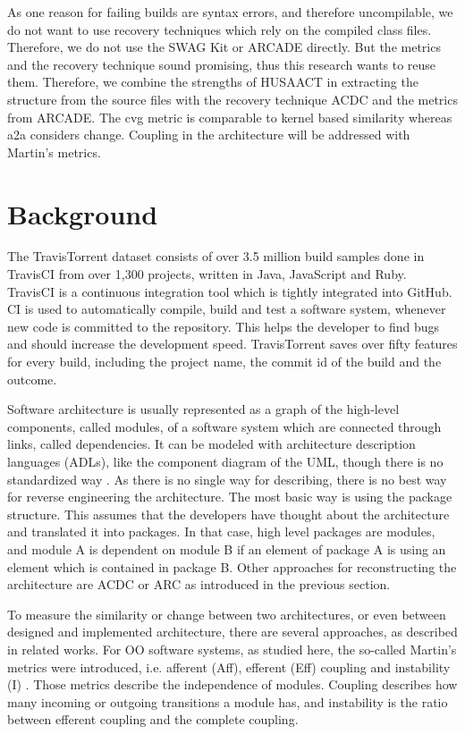 \documentclass[conference]{IEEEtran}
\begin{document}
As one reason for failing builds are syntax errors, and therefore uncompilable, we do not want to use recovery techniques which rely on the compiled class files. Therefore, we do not use the SWAG Kit or ARCADE directly.
But the metrics and the recovery technique sound promising, thus this research wants to reuse them. Therefore, we combine the strengths of HUSAACT in extracting the structure from the source files with the recovery technique ACDC and the metrics from ARCADE. The cvg metric is comparable to kernel based similarity whereas a2a considers change. Coupling in the architecture will be addressed with Martin's metrics.

\section{Background}

The TravisTorrent dataset \cite{TravisTorrent} consists of over 3.5 million build samples done in TravisCI from over 1,300 projects, written in Java, JavaScript and Ruby. TravisCI is a continuous integration tool which is tightly integrated into GitHub. CI is used to automatically compile, build and test a software system, whenever new code is committed to the repository. This helps the developer to find bugs and should increase the development speed. 
TravisTorrent saves over fifty features for every build, including the project name, the commit id of the build and the outcome.

Software architecture is usually represented as a graph of the high-level components, called modules, of a software system which are connected through links, called dependencies. It can be modeled with architecture description languages (ADLs), like the component diagram of the UML, though there is no standardized way \cite{UML-Arch}. 
As there is no single way for describing, there is no best way for reverse engineering the architecture. The most basic way is using the package structure. This assumes that the developers have thought about the architecture and translated it into packages. In that case, high level packages are modules, and module A is dependent on module B if an element of package A is using an element which is contained in package B.
Other approaches for reconstructing the architecture are ACDC or ARC as introduced in the previous section.

To measure the similarity or change between two architectures, or even between designed and implemented architecture, there are several approaches, as described in related works. For OO software systems, as studied here, the so-called Martin's metrics \cite{martinsMetrics} were introduced, i.e. afferent (Aff), efferent (Eff) coupling and instability (I) . Those metrics describe the independence of modules. Coupling describes how many incoming or outgoing transitions a module has, and instability is the ratio between efferent coupling and the complete coupling. 
\end{document}
